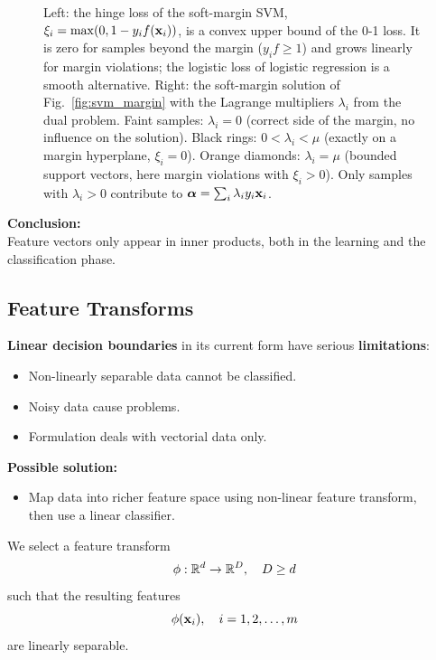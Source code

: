 \begin{figure}[htbp]
    \caption{Left: the hinge loss of the soft-margin SVM, $\xi_i=\max(0,1-y_if(\bm{\mathrm{x}}_i))$, is a convex upper bound of the 0-1 loss. It is zero for samples beyond the margin ($y_if\ge1$) and grows linearly for margin violations; the logistic loss of logistic regression is a smooth alternative. Right: the soft-margin solution of Fig.~\ref{fig:svm_margin} with the Lagrange multipliers $\lambda_i$ from the dual problem. Faint samples: $\lambda_i=0$ (correct side of the margin, no influence on the solution). Black rings: $0<\lambda_i<\mu$ (exactly on a margin hyperplane, $\xi_i=0$). Orange diamonds: $\lambda_i=\mu$ (bounded support vectors, here margin violations with $\xi_i>0$). Only samples with $\lambda_i>0$ contribute to $\bm{\mathrm{\alpha}}=\sum_i\lambda_iy_i\bm{\mathrm{x}}_i$.}
    \label{fig:svm_losses}
  \end{figure}

  \textbf{Conclusion:} \\
 
  Feature vectors only appear in inner products, both in the learning and the classification phase.
  
\subsection{Feature Transforms}
 \textbf{Linear decision boundaries} in its current form have serious \textbf{limitations}:
  \begin{itemize}
    \item  Non-linearly separable data cannot be classified.
    \item  Noisy data cause problems. 
    \item  Formulation deals with vectorial data only.
  \end{itemize}
  \textbf{Possible solution:} 
  \begin{itemize}
    \item Map data into richer feature space using non-linear feature transform, \\
      then use a linear classifier.
  \end{itemize}
  We select a feature transform 
  \begin{displaymath}
    \phi: \mathbb{R}^d \rightarrow \mathbb{R}^D, \quad D \ge d
  \end{displaymath}
  such that the resulting features 
  \begin{displaymath}
    \phi(\bm{\mathrm{x}}_i), \quad i = 1, 2, \dots, m
  \end{displaymath}
  are linearly separable.

